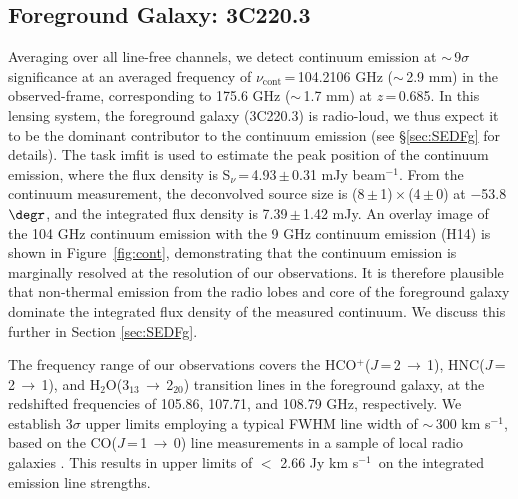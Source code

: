 \documentclass[iop, revtex4]{emulateapj}
\newcommand{\rarr}{$\rightarrow$}
\newcommand{\pmOne}{\mbox{$^{-1}$}}
\begin{document}
\subsection{Foreground Galaxy: 3C220.3}
Averaging over all line-free channels, we detect continuum emission at $\sim$\,9$\sigma$ significance at an averaged frequency of $\nu_\textrm{cont}$\,=\,104.2106 GHz ($\sim$\,2.9 mm) in the observed-frame, corresponding to 175.6 GHz ($\sim$\,1.7 mm) at $z$\,=\,0.685. In this lensing system, the
foreground galaxy (3C220.3) is radio-loud, we thus expect it to be the dominant contributor to the continuum emission (see \S \ref{sec:SEDFg} for details). The task {\sc imfit} is used to estimate the peak position of the continuum emission, where the flux density is S$_\nu$\,=\,4.93\,$\pm$\,0.31\,\,mJy\,\,beam\pmOne. From the continuum measurement, the deconvolved source size
is (8\,$\pm$\,1)\,$\times$\,(4\,$\pm$\,0) at $-$53.8$\degr$, and the integrated flux density is 7.39\,$\pm$\,1.42\,\,mJy. An overlay image of the 104 GHz
continuum emission with the 9 GHz continuum emission (H14) is shown in Figure~\ref{fig:cont}, demonstrating that the continuum
emission is marginally resolved at the resolution of our observations. It is therefore plausible that non-thermal emission from the radio lobes and core of the foreground galaxy dominate the integrated flux
density of the measured continuum. We discuss this further in Section \ref{sec:SEDFg}. \par
The frequency range of our observations covers the HCO$^+$($J$\,=\,2\,\rarr\,1), HNC($J$\,=\,2\,$\rightarrow$\,1), and H$_2$O(3$_{13}$\,\rarr\,2$_{20}$)
transition lines in the foreground galaxy, at
the redshifted frequencies of 105.86, 107.71, and 108.79\,\,GHz, respectively. We establish 3$\sigma$ upper limits employing a typical FWHM line width of
$\sim$\,300\,\,km\,\,s\pmOne, based on the CO($J$\,=\,1\,$\rightarrow$\,0) line measurements in a sample of local radio galaxies \citep[$z$ $<$ 0.1; ][]{Smolcic11a}. This results in upper limits of $<$ 2.66\,\,Jy\,\,km\,\,s\pmOne\ on the integrated emission line strengths.
\end{document}
